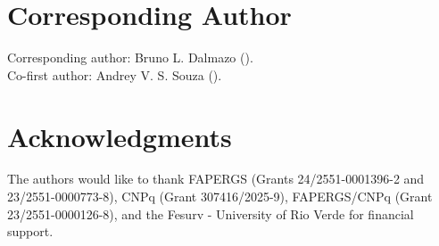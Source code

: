 \documentclass[sn-mathphys-num,Numbered]{sn-jnl}
\begin{document}
\section*{Corresponding Author}
Corresponding author: Bruno L. Dalmazo (). \\
Co-first author: Andrey V. S. Souza ().

\section*{Acknowledgments}
The authors would like to thank FAPERGS (Grants 24/2551-0001396-2 and 23/2551-0000773-8), CNPq (Grant 307416/2025-9), FAPERGS/CNPq (Grant 23/2551-0000126-8), and the Fesurv - University of Rio Verde for financial support.
\end{document}

